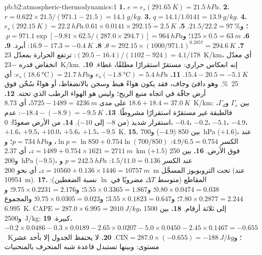 \begin{solution}{pb:b2:atmospheric-thermodynamics:1}
\textbf{1.} $e = e_s(\qty{291.65}{K}) = \qty{21.5}{hPa}$.
\textbf{2.} $r = 0.622 \times 21.5/(971.1 - 21.5) = \qty{14.1}{g/kg}$.
\textbf{3.} $q = 14.1/1.0141 = \qty{13.9}{g/kg}$.
\textbf{4.} $e_s(\qty{292.15}{K}) = \qty{22.2}{hPa}$؛ و$21.5/22.2 = \qty{97}{\percent}$.
\textbf{5.} $0.61 \times 0.0141 \times 292.15 = \qty{2.5}{K}$.
\textbf{6.} $125 \times 0.5 = \qty{63}{m}$؛ و$p = 971.1 \exp[-9.81 \times 62.5/(287.0 \times 294.7)]
= \qty{964}{hPa}$.
\textbf{7.} $\theta = 292.15 \times (1000/971.1)^{0.2857} = \qty{294.6}{K}$.
\textbf{8.} $16.9 - 17.3 = \qty{-0.4}{K}$: أبرد.
\textbf{9.} $(20.5 - 16.4)/(1102 - 924) = 4.1/178$: ترتفع الحرارة بمعدّل \qty{23}{K/km}، أي
معدّل انخفاض قدره \qty{-23}{K/km}. إنه انعكاس حراري: مستقرّ استقرارًا مطلقًا، غطاء.
\textbf{10.} $15.4 - 20.5 = \qty{-5.1}{K}$.
\textbf{11.} $e_s(\qty{-1.8}{\celsius}) = \qty{5.4}{hPa}$ و$e_s(\qty{18.6}{\celsius}) =
\qty{21.7}{hPa}$: أي \qty{25}{\percent}. وهو دافئ وجاف، فقد يكون هواءً هبط وسخن
بالانضغاط، أو هواءً سُخّن فوق أرض جافّة في اتجاه منبع الريح؛ وليس هو الهواء الرطب الذي تحته.
\textbf{12.} $18.6 + 18.4 = \qty{37.0}{K}$ على مدى $5725 - 1489 = \qty{4236}{m}$، أي \qty{8.73}{K/km}: بين $\Gamma_s$
و$\Gamma_d$، فالطبقة غير مستقرّة استقرارًا مشروطًا.
\textbf{13.} $-18.4 - (-8.9) = \qty{-9.5}{K}$: عدم استقرار شديد (من $-8$ إلى $-10$).
\textbf{14.} من الأرض صعودًا: 0، $-0.4$، $-0.2$، $-5.1$، $-4.9$، $+1.6$، $+9.5$، $+10.0$،
$+5.6$، $+1.5$، $-9.5$~\unit{K}.
\textbf{15.} بين 850 ($-4.9$) و\qty{700}{hPa} ($+1.6$)، عند الكسر $4.9/6.5 = 0.754$:
$\ln p = \ln 850 + 0.754 \ln(700/850)$، و$p = \qty{734}{hPa}$؛ و$z = 1489 + 0.754 \times 1621 =
\qty{2711}{m}$، أي \qty{2.37}{km} فوق الأرض.
\textbf{16.} بين 250 ($+1.5$) و\qty{200}{hPa} ($-9.5$)، عند الكسر $1.5/11.0 =
0.136$: $p = \qty{242.5}{hPa}$ و$z = 10560 + 0.136 \times 1446 = \qty{10757}{m}$، أي نحو
\qty{200}{m} تحت التروبوبوز المسجَّل (عند \qty{10954}{m}).
\textbf{17.} المقاطع (متوسط $\Delta T$ مضروبًا في $\ln$ نسبة الضغطين): $0.80 \times 0.0474
= 0.038$؛ و$5.55 \times 0.3365 = 1.867$؛ و$9.75 \times 0.2231 = 2.176$؛ و$7.80 \times 0.2877 =
2.244$؛ و$3.55 \times 0.1823 = 0.647$؛ و$0.75 \times 0.0305 = 0.023$؛ والمجموع \qty{6.995}{K}.
$\text{CAPE} = 287.0 \times 6.995 = \qty{2010}{J/kg}$، إلى ثلاثة أرقام.
\textbf{18.} بين 1500 و\qty{2500}{J/kg}: كبيرة.
\textbf{19.} $-0.2 \times 0.0486 - 0.3 \times 0.0189 - 2.65 \times 0.0207 - 5.0 \times 0.0450 -
2.45 \times 0.1467 = -0.655$~\unit{K}؛ و$\text{CIN} = 287.0 \times (-0.655) = \qty{-188}{J/kg}$.
\textbf{20.} لا يحتفظ الجدول إلا بأحد عشر مستوى: وبينها تستبدل قاعدة شبه المنحرف بالمنحنيات

\end{solution}
